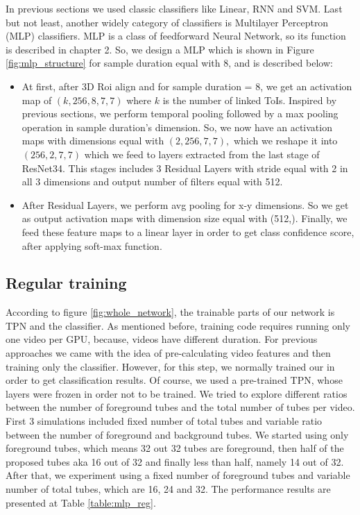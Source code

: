 In previous sections we used classic classifiers like Linear, RNN and SVM. Last but not least,
another widely category of classifiers  is Multilayer Perceptron (MLP) classifiers. MLP is a class of
feedforward Neural Network, so its function is described in chapter 2.
So, we design a MLP which is shown in Figure \ref{fig:mlp_structure} for sample duration equal with 8, and is described below:
\begin{itemize}
\item At first,  after 3D Roi align and for sample duration = 8, we get an activation map of $(k,256,8,7,7)$ where $k$ is the
  number of linked ToIs. Inspired by previous sections, we perform temporal pooling followed by a max pooling operation in
  sample duration's dimension. So, we now have an activation maps with dimensions equal with $(2,256,7,7),$ which we reshape
  it into $(256,2,7,7)$  which we feed to 
 layers  extracted from the last stage of ResNet34. This stages includes 3 Residual Layers
  with stride equal with 2 in all 3 dimensions and output number of filters equal with 512.

\item After Residual Layers, we perform avg pooling for x-y dimensions. So we get as output activation maps with dimension size
  equal with (512,).  Finally, we feed these feature maps to a linear layer in order to get class confidence score, after applying
  soft-max function.

\end{itemize}

\subsection{Regular training}
According to figure \ref{fig:whole_network}, the trainable parts of our network is TPN and the classifier.
As mentioned before, training code requires running only one video per GPU, because, videos have different duration. For previous approaches
we came with the idea of pre-calculating video features and then training only the classifier. However, for this step, we normally trained our
in order to get classification results. Of course, we used a pre-trained TPN, whose layers were frozen in order not to be trained.
We tried to explore different ratios between the number of foreground tubes and the total number of tubes per video. First 3 simulations included
fixed number of total tubes and variable ratio between the number of foreground and background tubes. We started using only foreground tubes, which
means 32 out 32 tubes are foreground, then half of the proposed tubes aka 16 out of 32 and finally less than half, namely 14 out of 32. After that,
we experiment using a fixed number of foreground tubes and variable number of total tubes, which are 16, 24 and 32. The performance results are presented
at Table \ref{table:mlp_reg}.

